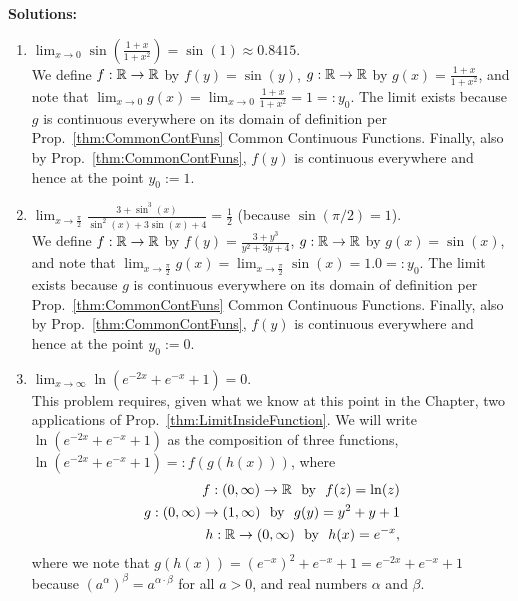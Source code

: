 \textbf{Solutions:}

\begin{enumerate}
\renewcommand{\labelenumi}{(\alph{enumi})}
\setlength{\itemsep}{.2cm}

\item \Ans $ \displaystyle \lim_{x \to 0} \sin\left( \frac{1 + x}{1 + x^2} \right) = \sin(1) \approx 0.8415$. \\

We define $f:\mathbb R \to \mathbb R$ by $f(y) = \sin(y)$,  $g: \mathbb R \to \mathbb R$ by $g(x) = \frac{1 + x}{1 + x^2}$, and note that  $\displaystyle \lim_{x \to 0} g(x) = \lim_{x \to 0} \frac{1 + x}{1 + x^2} = 1=:y_0$. The limit exists because $g$ is continuous everywhere on its domain of definition per Prop.~\ref{thm:CommonContFuns} Common Continuous Functions. Finally, also by Prop.~\ref{thm:CommonContFuns}, $f(y)$ is continuous everywhere and hence at the point $y_0:=1$.

\item \Ans $ \displaystyle \lim_{x \to \frac{\pi}{2} } \frac{3 + \sin^3(x)}{\sin^2(x) + 3 \sin(x) + 4} = \frac{1}{2}$ (because $\sin(\pi/2) = 1$). \\

We define $f:\mathbb R \to \mathbb R$ by $f(y) = \frac{3 + y^3}{y^2 + 3 y + 4} $,  $g: \mathbb R \to \mathbb R$ by $g(x) = \sin(x)$, and note that  $\displaystyle \lim_{x \to \frac{\pi}{2} } g(x) = \lim_{x \to \frac{\pi}{2} } \sin(x)= 1.0 =:y_0$. The limit exists because $g$ is continuous everywhere on its domain of definition per Prop.~\ref{thm:CommonContFuns} Common Continuous Functions. Finally, also by Prop.~\ref{thm:CommonContFuns}, $f(y)$ is continuous everywhere and hence at the point $y_0:=0$.

\item \Ans $ \displaystyle \lim_{x \to \infty} \ln(e^{-2x} + e^{-x} + 1) = 0$.\\

This problem requires, given what we know at this point in the Chapter, two applications of Prop.~\ref{thm:LimitInsideFunction}. We will write $ \ln(e^{-2x} + e^{-x} + 1)$ as the composition of three functions, $ \ln(e^{-2x} + e^{-x} + 1) = : f(g(h(x)))$, where
\begin{align*}
    f:(0, \infty) \to \mathbb R ~\text{ by } ~f(z) = \ln(z) \\
    g:(0, \infty) \to (1, \infty) ~\text{ by } ~g(y) = y^2 + y + 1\\
    h:\mathbb R \to (0, \infty) ~\text{ by } ~h(x) = e^{-x},
\end{align*}
where we note that $g(h(x)) = (e^{-x})^2 + e^{-x} + 1 = e^{-2x} + e^{-x} + 1$ because $\left(  a^\alpha \right)^{\beta} = a^{\alpha \cdot \beta}$ for all $a>0$, and real numbers $\alpha $ and $\beta$.\\


\end{enumerate}
